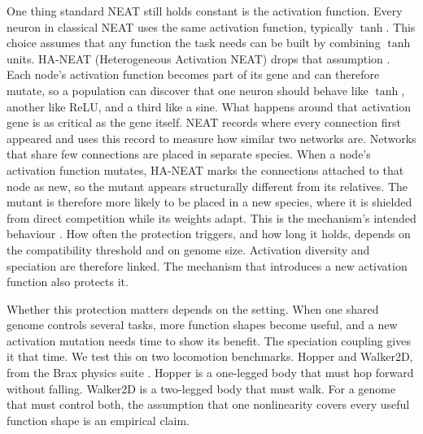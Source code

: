 \documentclass[12pt]{article}
\begin{document}
One thing standard NEAT still holds constant is the activation function.
Every neuron in classical NEAT uses the same activation function, typically $\tanh$.
This choice assumes that any function the task needs can be built by combining $\tanh$ units.
HA-NEAT (Heterogeneous Activation NEAT) drops that assumption \parencite{hagg_evolving_2017}.
Each node's activation function becomes part of its gene and can therefore mutate, so a population can discover that one neuron should behave like $\tanh$, another like ReLU, and a third like a sine.
What happens around that activation gene is as critical as the gene itself.
NEAT records where every connection first appeared and uses this record to measure how similar two networks are. Networks that share few connections are placed in separate species.
When a node's activation function mutates, HA-NEAT marks the connections attached to that node as new, so the mutant appears structurally different from its relatives.
The mutant is therefore more likely to be placed in a new species, where it is shielded from direct competition while its weights adapt. This is the mechanism's intended behaviour \parencite{hagg_evolving_2017}. How often the protection triggers, and how long it holds, depends on the compatibility threshold and on genome size.
Activation diversity and speciation are therefore linked. The mechanism that introduces a new activation function also protects it.

Whether this protection matters depends on the setting.
When one shared genome controls several tasks, more function shapes become useful, and a new activation mutation needs time to show its benefit.
The speciation coupling gives it that time.
We test this on two locomotion benchmarks. Hopper and Walker2D, from the Brax physics suite \parencite{freeman_brax_2021}.
Hopper is a one-legged body that must hop forward without falling. Walker2D is a two-legged body that must walk.
For a genome that must control both, the assumption that one nonlinearity covers every useful function shape is an empirical claim.


\end{document}
